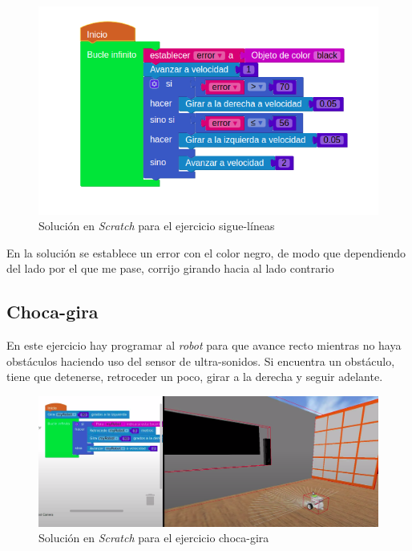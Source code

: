         \begin{figure}[H]
    \centering
    \includegraphics[scale=0.5]{img/solucion.png}
    \caption{Solución en \textit{Scratch} para el ejercicio sigue-líneas} 
    \label{fig:solucion}
    \end{figure}
    
En la solución se establece un error con el color negro, de modo que dependiendo del lado por el que me pase, corrijo girando hacia al lado contrario
    
    
\subsection{Choca-gira}
\label{subsec:chocagira}
En este ejercicio hay programar al \textit{robot} para que avance recto mientras no haya obstáculos haciendo uso del sensor de ultra-sonidos. Si encuentra un obstáculo, tiene que detenerse, retroceder un poco, girar a la derecha y seguir adelante.


    \begin{figure}[H]
    \centering
    \includegraphics[scale=0.25]{img/chocagira.png}
    \caption{Solución en \textit{Scratch} para el ejercicio choca-gira} 
    \label{fig:chocagira}
    \end{figure}
    
